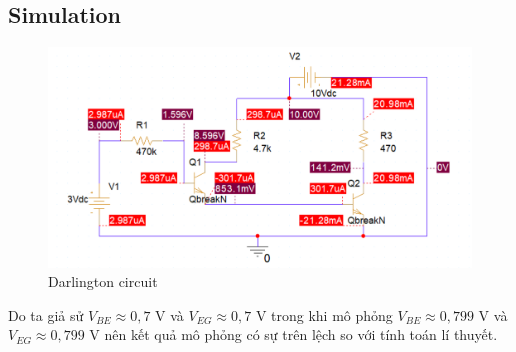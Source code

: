 \subsection{Simulation}
\begin{figure}[ht]
    \centering
    \includegraphics[scale=0.3]{graphics/ex9/f2.png}
    \caption{Darlington circuit}
\end{figure}

Do ta giả sử \(V_{BE} \approx 0,7 \) V và \(V_{EG} \approx 0,7 \) V trong khi mô phỏng \(V_{BE} \approx 0,799 \) V và \(V_{EG} \approx 0,799 \) V nên kết quả mô phỏng có sự trên lệch so với tính toán lí thuyết.

\pagebreak
